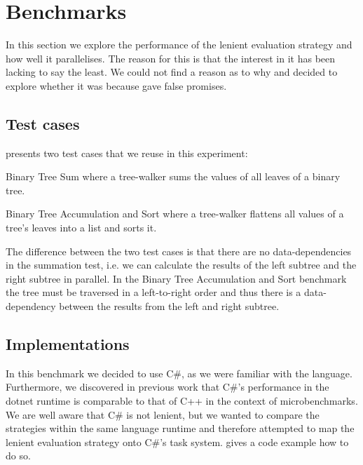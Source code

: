\section{Benchmarks}
In this section we explore the performance of the lenient evaluation strategy and how well it parallelises. The reason for this is that the interest in it has been lacking to say the least. We could not find a reason as to why and decided to explore whether it was because \cite{DBLP:journals/cl/Tremblay-parallel} gave false promises.

\subsection{Test cases}
\cite{DBLP:journals/cl/Tremblay-parallel} presents two test cases that we reuse in this experiment:

\begin{labeling}{\quad\quad}
    \item[Binary Tree Sum] where a tree-walker sums the values of all leaves of a binary tree.
    \item[Binary Tree Accumulation and Sort] where a tree-walker flattens all values of a tree's leaves into a list and sorts it.
\end{labeling}

The difference between the two test cases is that there are no data-dependencies in the summation test, i.e. we can calculate the results of the left subtree and the right subtree in parallel. In the Binary Tree Accumulation and Sort benchmark the tree must be traversed in a left-to-right order and thus there is a data-dependency between the results from the left and right subtree.

\subsection{Implementations}
In this benchmark we decided to use C\#, as we were familiar with the language. Furthermore, we discovered in previous work that C\#'s performance in the dotnet runtime is comparable to that of C++ in the context of microbenchmarks\cite{p92018gameplay}. We are well aware that C\# is not lenient, but we wanted to compare the strategies within the same language runtime and therefore attempted to map the lenient evaluation strategy onto C\#'s task system.  gives a code example how to do so.

